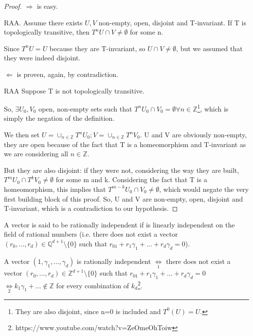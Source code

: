 \begin{proof}
    $\Rightarrow$ is easy. 
    
    RAA. Assume there exists $U, V$ non-empty, open, disjoint and T-invariant. If T is topologically transitive, then $T^{n}U\cap V\neq\emptyset$ for some n.
    
    Since $T^nU=U$ because they are T-invariant, so $U\cap V\neq\emptyset$, but we assumed that they were indeed disjoint.

    $\Leftarrow$ is proven, again, by contradiction. 
    
    RAA Suppose T is not topologically transitive. 
    
    So, $\exists U_0, V_0$ open, non-empty sets such that $T^nU_0\cap V_0 = \emptyset \forall n\in \mathbb{Z}$\footnote{They are also disjoint, since n=0 is included and $T^0(U)=U$.}, which is simply the negation of the definition. 
    
    We then set $U=\cup_{n\in\mathbb{Z}}T^nU_0; V=\cup_{n\in\mathbb{Z}}T^{n}V_0$. U and V are obviously non-empty, they are open because of the fact that T is a homeomorphism and T-invariant as we are considering all $n\in\mathbb{Z}$.
    
    But they are also disjoint: if they were not, considering the way they are built, $T^mU_0 \cap T^kV_0\neq\emptyset$ for some m and k. Considering the fact that T is a homeomorphism, this implies that $T^{m-k}U_0\cap V_0\neq \emptyset$, which would negate the very first building block of this proof. So, U and V are non-empty, open, disjoint and T-invariant, which is a contradiction to our hypothesis.
\end{proof}

\begin{definition}
    A vector is said to be rationally independent if is linearly independent on the field of rational numbers (i.e. there does not exist a vector $(r_0,...,r_d)\in\mathbb{Q}^{d+1}\setminus \{0\}$ such that $r_01+r_1\gamma_1+...+r_d\gamma_d=0$).
\end{definition}

\begin{proposition}
    A vector $(1, \gamma_1,...,\gamma_d)$ is rationally independent $\underset{1}{\iff}$ there does not exist a vector $(r_0,...,r_d)\in\mathbb{Z}^{d+1}\setminus \{0\}$ such that $r_01+r_1\gamma_1+...+r_d\gamma_d=0$ $\underset{2}{\iff} k_1\gamma_1+...\notin\mathbb{Z}$ for every combination of $k_d$\footnote{https://www.youtube.com/watch?v=ZeOmeOhToiw}.
\end{proposition}

